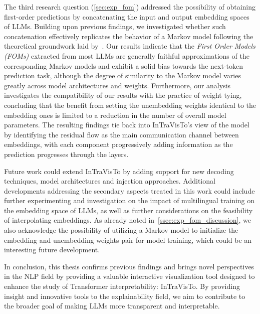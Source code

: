 The third research question (\cref{sec:exp_fom}) addressed the possibility of obtaining first-order predictions by concatenating the input and output embedding spaces of LLMs.
Building upon previous findings, we investigated whether such concatenation effectively replicates the behavior of a Markov model following the theoretical groundwork laid by~\citet{elhage2021}.
Our results indicate that the \emph{First Order Models (FOMs)} extracted from most LLMs are generally faithful approximations of the corresponding Markov models and exhibit a solid bias towards the next-token prediction task, although the degree of similarity to the Markov model varies greatly across model architectures and weights.
Furthermore, our analysis investigates the compatibility of our results with the practice of weight tying, concluding that the benefit from setting the unembedding weights identical to the embedding ones is limited to a reduction in the number of overall model parameters.
The resulting findings tie back into InTraVisTo's view of the model by identifying the residual flow as the main communication channel between embeddings, with each component progressively adding information as the prediction progresses through the layers.

Future work could extend InTraVisTo by adding support for new decoding techniques, model architectures and injection approaches.
Additional developments addressing the secondary aspects treated in this work could include further experimenting and investigation on the impact of multilingual training on the embedding space of LLMs, as well as further considerations on the feasibility of interpolating embeddings.
As already noted in~\cref{ssec:exp_fom_discussion}, we also acknowledge the possibility of utilizing a Markov model to initialize the embedding and unembedding weights pair for model training, which could be an interesting future development.

In conclusion, this thesis confirms previous findings and brings novel perspectives in the NLP field by providing a valuable interactive visualization tool designed to enhance the study of Transformer interpretability: InTraVisTo.
By providing insight and innovative tools to the explainability field, we aim to contribute to the broader goal of making LLMs more transparent and interpretable.
